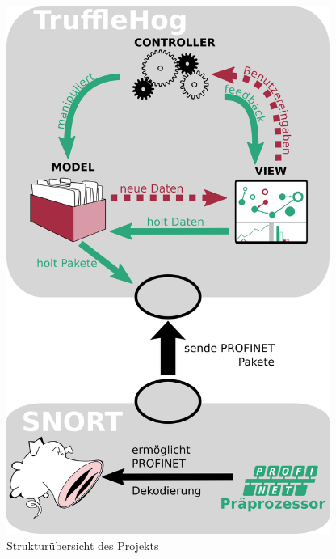 \begin{figure}[H]
  \centering
  \includegraphics[width=300pt]{../diagrams/intro_diagram/intro_diagram.png}
  \caption[Strukturübersicht des Projekts]{Strukturübersicht des Projekts}\label{fig:diagram}
\end{figure}